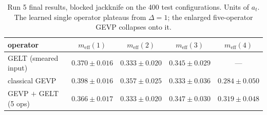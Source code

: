 \documentclass[11pt,a4paper]{article}
\newcommand{\meff}{m_{\mathrm{eff}}}
\newcommand{\at}{a_t}
\begin{document}
\begin{table}[htbp]
  \centering
  \begin{tabular}{lcccc}
    \toprule
    operator & $\meff(1)$ & $\meff(2)$ & $\meff(3)$ & $\meff(4)$ \\
    \midrule
    GELT (smeared input)      & $\mathbf{0.370\pm0.016}$ & $\mathbf{0.333\pm0.020}$ & $0.345\pm0.029$ & --- \\
    classical GEVP            & $0.398\pm0.016$ & $0.357\pm0.025$ & $0.333\pm0.036$ & $0.284\pm0.050$ \\
    GEVP $+$ GELT (5 ops)     & $0.366\pm0.017$ & $0.333\pm0.020$ & $0.347\pm0.030$ & $0.319\pm0.048$ \\
    \bottomrule
  \end{tabular}
  \caption{Run 5 final results, blocked jackknife on the 400 test
  configurations. Units of $\at$. The learned single operator plateaus from
  $\Delta=1$; the enlarged five-operator GEVP collapses onto it.}
  \label{tab:run5}
\end{table}
\end{document}
